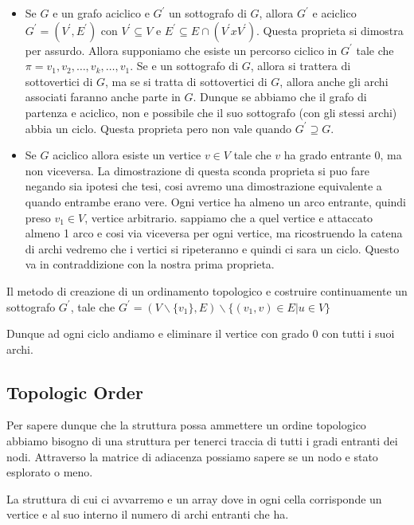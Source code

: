 \begin{itemize}
	\item Se $G$ e un grafo aciclico e $G^{\prime}$ un sottografo di $G$, allora  $G^{\prime}$  e aciclico $G^{\prime} = (V^{\prime}, E^{\prime}) \text{ con } V^{\prime} \subseteq V \text{ e } E^{\prime} \subseteq E \cap (V^{\prime} x V^{\prime})$.
		Questa proprieta si dimostra per assurdo. Allora supponiamo che esiste un percorso ciclico in $G^{\prime}$ tale che $\pi = v_{1},v_{2},\dots,v_{k},\dots,v_{1}$. Se e un sottografo di $G$, allora si trattera di sottovertici di $G$, ma se si tratta di sottovertici di $G$, allora anche gli archi associati faranno anche parte in $G$. Dunque se abbiamo che il grafo di partenza e aciclico, non e possibile che il suo sottografo (con gli stessi archi) abbia un ciclo. Questa proprieta pero non vale quando $G^{\prime} \supseteq G$.
	\item Se $G$ aciclico allora esiste un vertice $v \in V$ tale che $v$ ha grado entrante 0, ma non viceversa.
		La dimostrazione di questa sconda proprieta si puo fare negando sia ipotesi che tesi, cosi avremo una dimostrazione equivalente a quando entrambe erano vere.
		Ogni vertice ha almeno un arco entrante, quindi preso $v_{1} \in V$, vertice arbitrario. sappiamo che a quel vertice e attaccato almeno 1 arco e cosi via viceversa per ogni vertice, ma ricostruendo la catena di archi vedremo che i vertici si ripeteranno e quindi ci sara un ciclo. Questo va in contraddizione con la nostra prima proprieta.
\end{itemize}

Il metodo di creazione di un ordinamento topologico e costruire continuamente un sottografo $G^{\prime}$, tale che 
$G^{\prime} = (V \backslash \{v_{1}\}, E) \backslash \{(v_{1},v) \in E \vert u \in V\}$

Dunque ad ogni ciclo andiamo e eliminare il vertice con grado 0 con tutti i suoi archi.

\subsection{Topologic Order}
Per sapere dunque che la struttura possa ammettere un ordine topologico abbiamo bisogno di una struttura per tenerci traccia di tutti i gradi entranti dei nodi. Attraverso la matrice di adiacenza possiamo sapere se un nodo e stato esplorato o meno.

La struttura di cui ci avvarremo e un array dove in ogni cella corrisponde un vertice e al suo interno il numero di archi entranti che ha.

